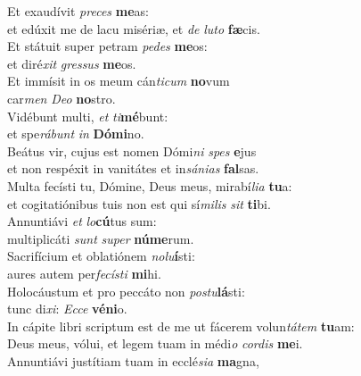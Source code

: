 \evenverse Et exaudívit \textit{pre}\textit{ces} \textbf{me}as:~\*\\
\evenverse et edúxit me de lacu misériæ, et \textit{de} \textit{lu}\textit{to} \textbf{fæ}cis.\\
\oddverse Et státuit super petram \textit{pe}\textit{des} \textbf{me}os:~\*\\
\oddverse et diré\textit{xit} \textit{gres}\textit{sus} \textbf{me}os.\\
\evenverse Et immísit in os meum cán\textit{ti}\textit{cum} \textbf{no}vum~\*\\
\evenverse car\textit{men} \textit{De}\textit{o} \textbf{no}stro.\\
\oddverse Vidébunt multi, \textit{et} \textit{ti}\textbf{mé}bunt:~\*\\
\oddverse et spe\textit{rá}\textit{bunt} \textit{in} \textbf{Dó}\textbf{mi}no.\\
\evenverse Beátus vir, cujus est nomen Dómi\textit{ni} \textit{spes} \textbf{e}jus~\*\\
\evenverse et non respéxit in vanitátes et in\textit{sá}\textit{ni}\textit{as} \textbf{fal}sas.\\
\oddverse Multa fecísti tu, Dómine, Deus meus, mirabí\textit{li}\textit{a} \textbf{tu}a:~\*\\
\oddverse et cogitatiónibus tuis non est qui sí\textit{mi}\textit{lis} \textit{sit} \textbf{ti}bi.\\
\evenverse Annuntiávi \textit{et} \textit{lo}\textbf{cú}tus sum:~\*\\
\evenverse multiplicáti \textit{sunt} \textit{su}\textit{per} \textbf{nú}\textbf{me}rum.\\
\oddverse Sacrifícium et oblatiónem \textit{no}\textit{lu}\textbf{í}sti:~\*\\
\oddverse aures autem per\textit{fe}\textit{cí}\textit{sti} \textbf{mi}hi.\\
\evenverse Holocáustum et pro peccáto non \textit{po}\textit{stu}\textbf{lá}sti:~\*\\
\evenverse tunc di\textit{xi}: \textit{Ec}\textit{ce} \textbf{vé}\textbf{ni}o.\\
\oddverse In cápite libri scriptum est de me ut fácerem volun\textit{tá}\textit{tem} \textbf{tu}am:~\*\\
\oddverse Deus meus, vólui, et legem tuam in médi\textit{o} \textit{cor}\textit{dis} \textbf{me}i.\\
\evenverse Annuntiávi justítiam tuam in ecclé\textit{si}\textit{a} \textbf{ma}gna,~\*\\
